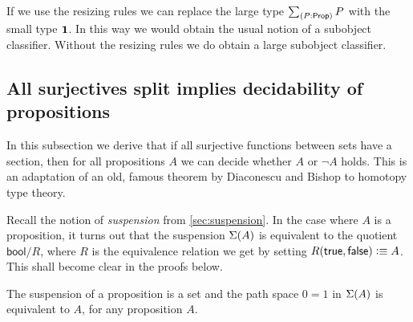 If we use the resizing rules we can replace the large type $\sm{P:\prop} P$ with the small type $\mathbf{1}$. In this way we would obtain
the usual notion of a subobject classifier. Without the resizing rules we do obtain a large subobject classifier.



\subsection{All surjectives split implies decidability of propositions}\label{sec:surj-split}
In this subsection we derive that if all surjective functions between sets have
a section, then for all propositions $A$ we can decide whether $A$ or $\neg A$
holds. This is an adaptation of an old, famous theorem by
Diaconescu and Bishop to homotopy type theory.

Recall the notion of \emph{suspension} from \autoref{sec:suspension}.
In the case where $A$ is a proposition, it turns out that the
suspension $\Sigma(A)$ is equivalent to the quotient $\mathsf{bool}/R$,
where $R$ is the equivalence relation we get by setting
$R(\mathsf{true},\mathsf{false})\vcentcolon\equiv A$. This shall become clear in the proofs
below.

\begin{lem}\label{prop:trunc_of_prop_is_set}
The suspension of a proposition is a set and the path space 
$0=1$ in $\Sigma(A)$ is equivalent to $A$, for any proposition $A$. 
\end{lem}

